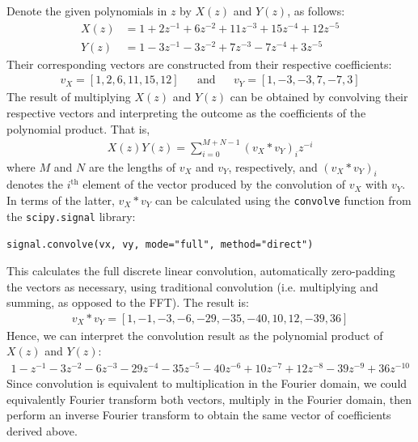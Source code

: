 \documentclass[a4paper, 11pt]{article}
\begin{document}
Denote the given polynomials in $z$ by $X(z)$ and $Y(z)$, as follows:
\begin{align*}
    X(z) &= 1 + 2z^{-1} + 6z^{-2} + 11z^{-3} + 15z^{-4} + 12z^{-5} \\
    Y(z) &= 1 - 3z^{-1} - 3z^{-2} + 7z^{-3} - 7z^{-4} + 3z^{-5}
\end{align*}
Their corresponding vectors are constructed from their respective coefficients:
\begin{align*}
    v_X = [1, 2, 6, 11, 15, 12] && \text{and} && v_Y = [1, -3, -3, 7, -7, 3]
\end{align*}
The result of multiplying $X(z)$ and $Y(z)$ can be obtained by convolving their
respective vectors and interpreting the outcome as the coefficients of the
polynomial product. That is,
\begin{align*}
    X(z)Y(z) = \sum_{i=0}^{M+N-1} (v_X \ast v_Y)_i z^{-i}
\end{align*}
where $M$ and $N$ are the lengths of $v_X$ and $v_Y$, respectively, and
$(v_X\ast v_Y)_i$ denotes the $i^\text{th}$ element of the vector produced by
the convolution of $v_X$ with $v_Y$. In terms of the latter, $v_X\ast v_Y$ can
be calculated using the \texttt{convolve} function from the
\texttt{scipy.signal} library:
\begin{center}
    \texttt{signal.convolve(vx, vy, mode="full", method="direct")}
\end{center}
This calculates the full discrete linear convolution, automatically
zero-padding the vectors as necessary, using traditional convolution (i.e.
multiplying and summing, as opposed to the FFT). The result is:
\begin{align*}
    v_X \ast v_Y = [1, -1, -3, -6, -29, -35, -40, 10, 12, -39, 36]
\end{align*}
Hence, we can interpret the convolution result as the polynomial product of
$X(z)$ and $Y(z)$:
\begin{align*}
    1 - z^{-1} - 3z^{-2} - 6z^{-3} - 29z^{-4} - 35z^{-5} - 40z^{-6} + 10z^{-7} +
    12z^{-8} - 39z^{-9} + 36z^{-10}
\end{align*}
Since convolution is equivalent to multiplication in the Fourier domain, we
could equivalently Fourier transform both vectors, multiply in the Fourier
domain, then perform an inverse Fourier transform to obtain the same vector of
coefficients derived above.
\end{document}
